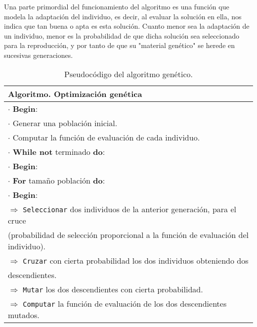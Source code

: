 Una parte primordial del funcionamiento del algoritmo es una función que modela la adaptación del individuo, es decir, al evaluar la solución en ella, nos indica que tan buena o apta es esta solución.  Cuanto menor sea la adaptación de un individuo, menor es la probabilidad de que dicha solución
sea seleccionado para la reproducción, y por tanto de que su "material genético" se herede en sucesivas
generaciones.
\begin{table}[H]
\centering
\caption{Pseudocódigo del algoritmo genético.}
\label{T:gen}
\begin{tabular}{l}
    \hline
   \cellcolor{lightgray} \textbf{Algoritmo}. Optimización genética \\
    \hline
    \hline
     $\cdot$ \textbf{Begin}:\\
     \hspace{0.6cm} $\cdot$ Generar una población inicial.\\
     \hspace{0.6cm} $\cdot$ Computar la función de evaluación de cada individuo.\\
     \hspace{0.6cm} $\cdot$ \textbf{While not} terminado \textbf{do}:\\
     \hspace{0.6cm} $\cdot$ \textbf{Begin}:\\
     \hspace{1.2cm} $\cdot$ \textbf{For} tamaño población \textbf{do}:\\
     \hspace{1.2cm} $\cdot$ \textbf{Begin}:\\
     \hspace{1.8cm} $\Rightarrow$ \texttt{Seleccionar} dos individuos de la anterior generación, para el cruce\\\hspace{1.8cm} (probabilidad de selección proporcional a la función de evaluación del individuo).\\
     \hspace{1.8cm} $\Rightarrow$ \texttt{Cruzar} con cierta probabilidad los dos individuos  obteniendo dos \\\hspace{1.8cm} descendientes. \\
     \hspace{1.8cm} $\Rightarrow$ \texttt{Mutar} los dos descendientes con cierta probabilidad. \\
     \hspace{1.8cm} $\Rightarrow$ \texttt{Computar} la función de evaluación de los dos descendientes mutados.\\

\end{tabular}
\end{table}

